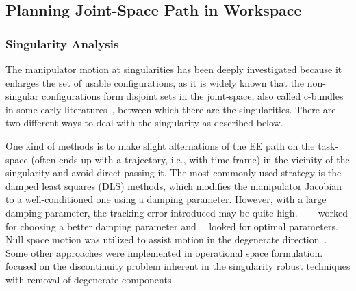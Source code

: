 \documentclass[Afour,sageh,times]{sagej}
\begin{document}
\subsection{Planning Joint-Space Path in Workspace}
\subsubsection{Singularity Analysis}
The manipulator motion at singularities has been deeply investigated because it enlarges the set of  usable configurations, as it is widely known that the non-singular configurations form disjoint sets in the joint-space, also called c-bundles in some early literatures~\cite{Luck1993Self}, between which there are the singularities. 
There are two different ways to deal with the singularity as described below. 

One kind of methods is to make slight alternations of the EE path on the task-space (often ends up with a trajectory, i.e., with time frame) in the vicinity of the singularity and avoid direct passing it. 
The most commonly used strategy is the damped least squares (DLS) methods, which modifies the manipulator Jacobian to a well-conditioned one using a damping parameter. However, with a large damping parameter, the tracking error introduced may be quite high.
~\cite{Nakamura1986Inverse}~\cite{Wampler1986Manipulator}~\cite{Maciejewski1988Numerical} worked for choosing a better damping parameter and~\cite{Maciejewski1989Singular}~\cite{Deo1992Robot} looked for optimal parameters. 
Null space motion was utilized to assist motion in the degenerate direction~\cite{Oetomo2001Singularity}. 
Some other approaches were implemented in operational space formulation.
~\cite{Oetomo2009Singularity} focused on the discontinuity problem inherent in the singularity robust techniques with removal of degenerate components. 
\end{document}
